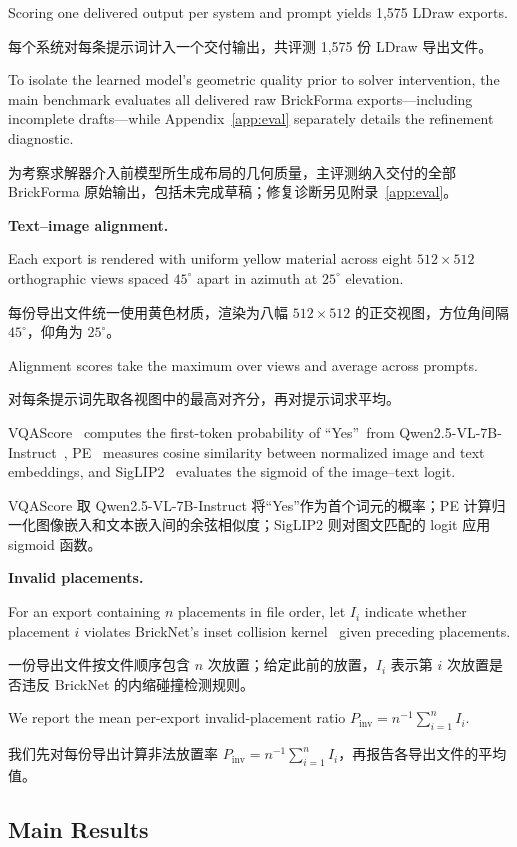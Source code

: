 \documentclass[11pt,letterpaper]{article}
\let\cite\citep
\newcommand{\zh}[1]{{\chinesefont #1}}
\newcommand{\pair}[2]{\par\addvspace{4pt}\noindent
  \begin{minipage}{\linewidth}\raggedright
  #1\par\nobreak\vspace{1pt}
  {\color{translation}\chinesefont\fontsize{10.5}{15.3}\selectfont #2\par}
  \end{minipage}\par}
\newcommand{\readinghead}[2]{\par\addvspace{9pt}\noindent\textbf{#1}\enspace
  {\color{translation}\zh{#2}}\par\nobreak}
\begin{document}
\pair{Scoring one delivered output per system and prompt yields 1,575 LDraw exports.}{每个系统对每条提示词计入一个交付输出，共评测 1,575 份 LDraw 导出文件。}

\pair{To isolate the learned model's geometric quality prior to solver intervention, the main benchmark evaluates all delivered raw BrickForma exports---including incomplete drafts---while Appendix~\ref{app:eval} separately details the refinement diagnostic.}{为考察求解器介入前模型所生成布局的几何质量，主评测纳入交付的全部 BrickForma 原始输出，包括未完成草稿；修复诊断另见附录~\ref{app:eval}。}

\readinghead{Text--image alignment.}{图文对齐}

\pair{Each export is rendered with uniform yellow material across eight $512{\times}512$ orthographic views spaced $45^\circ$ apart in azimuth at $25^\circ$ elevation.}{每份导出文件统一使用黄色材质，渲染为八幅 $512{\times}512$ 的正交视图，方位角间隔 $45^\circ$，仰角为 $25^\circ$。}

\pair{Alignment scores take the maximum over views and average across prompts.}{对每条提示词先取各视图中的最高对齐分，再对提示词求平均。}

\pair{VQAScore~\cite{vqascore} computes the first-token probability of \textquotedblleft Yes\textquotedblright\ from Qwen2.5-VL-7B-Instruct~\cite{qwen25vl}, PE~\cite{pe} measures cosine similarity between normalized image and text embeddings, and SigLIP2~\cite{siglip2} evaluates the sigmoid of the image--text logit.}{VQAScore 取 Qwen2.5-VL-7B-Instruct 将“Yes”作为首个词元的概率；PE 计算归一化图像嵌入和文本嵌入间的余弦相似度；SigLIP2 则对图文匹配的 logit 应用 sigmoid 函数。}

\readinghead{Invalid placements.}{非法放置}

\pair{For an export containing $n$ placements in file order, let $I_i$ indicate whether placement $i$ violates BrickNet's inset collision kernel~\cite{bricknet} given preceding placements.}{一份导出文件按文件顺序包含 $n$ 次放置；给定此前的放置，$I_i$ 表示第 $i$ 次放置是否违反 BrickNet 的内缩碰撞检测规则。}

\pair{We report the mean per-export invalid-placement ratio $P_{\mathrm{inv}}=n^{-1}\sum_{i=1}^{n}I_i$.}{我们先对每份导出计算非法放置率 $P_{\mathrm{inv}}=n^{-1}\sum_{i=1}^{n}I_i$，再报告各导出文件的平均值。}

\subsection{Main Results\enspace\zh{主要结果}}
\end{document}
